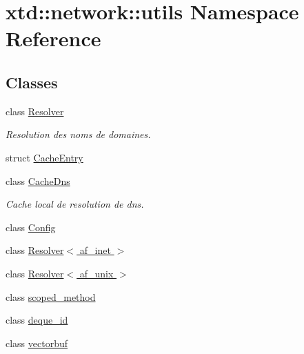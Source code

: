 \hypertarget{namespacextd_1_1network_1_1utils}{\section{xtd\-:\-:network\-:\-:utils Namespace Reference}
\label{namespacextd_1_1network_1_1utils}
}
\subsection*{Classes}
\begin{DoxyCompactItemize}
\item 
class \hyperlink{classxtd_1_1network_1_1utils_1_1Resolver}{Resolver}
\begin{DoxyCompactList}\small\item\em Resolution des noms de domaines. \end{DoxyCompactList}\item 
struct \hyperlink{structxtd_1_1network_1_1utils_1_1CacheEntry}{Cache\-Entry}
\item 
class \hyperlink{classxtd_1_1network_1_1utils_1_1CacheDns}{Cache\-Dns}
\begin{DoxyCompactList}\small\item\em Cache local de resolution de dns. \end{DoxyCompactList}\item 
class \hyperlink{classxtd_1_1network_1_1utils_1_1Config}{Config}
\item 
class \hyperlink{classxtd_1_1network_1_1utils_1_1Resolver_3_01af__inet_01_4}{Resolver$<$ af\-\_\-inet $>$}
\item 
class \hyperlink{classxtd_1_1network_1_1utils_1_1Resolver_3_01af__unix_01_4}{Resolver$<$ af\-\_\-unix $>$}
\item 
class \hyperlink{classxtd_1_1network_1_1utils_1_1scoped__method}{scoped\-\_\-method}
\item 
class \hyperlink{classxtd_1_1network_1_1utils_1_1deque__id}{deque\-\_\-id}
\item 
class \hyperlink{classxtd_1_1network_1_1utils_1_1vectorbuf}{vectorbuf}
\end{DoxyCompactItemize}
